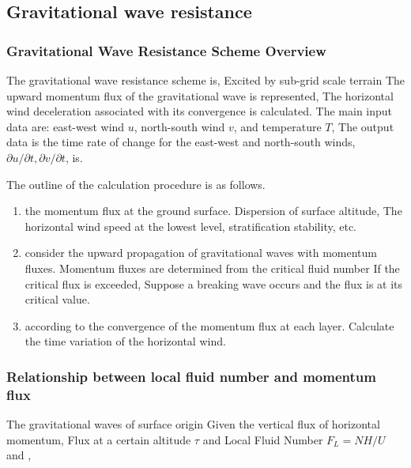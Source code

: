 \hypertarget{gravitational-wave-resistance}{%
\subsection{Gravitational wave
resistance}\label{gravitational-wave-resistance}}

\hypertarget{gravitational-wave-resistance-scheme-overview}{%
\subsubsection{Gravitational Wave Resistance Scheme
Overview}\label{gravitational-wave-resistance-scheme-overview}}

The gravitational wave resistance scheme is, Excited by sub-grid scale
terrain The upward momentum flux of the gravitational wave is
represented, The horizontal wind deceleration associated with its
convergence is calculated. The main input data are: east-west wind
\(u\), north-south wind \(v\), and temperature \(T\), The output data is
the time rate of change for the east-west and north-south winds,
\(\partial u/\partial t, \partial v/\partial t\), is.

The outline of the calculation procedure is as follows.

\begin{enumerate}
\def\labelenumi{\arabic{enumi}.}
\item
  the momentum flux at the ground surface. Dispersion of surface
  altitude, The horizontal wind speed at the lowest level,
  stratification stability, etc.
\item
  consider the upward propagation of gravitational waves with momentum
  fluxes. Momentum fluxes are determined from the critical fluid number
  If the critical flux is exceeded, Suppose a breaking wave occurs and
  the flux is at its critical value.
\item
  according to the convergence of the momentum flux at each layer.
  Calculate the time variation of the horizontal wind.
\end{enumerate}

\hypertarget{relationship-between-local-fluid-number-and-momentum-flux}{%
\subsubsection{Relationship between local fluid number and momentum
flux}\label{relationship-between-local-fluid-number-and-momentum-flux}}

The gravitational waves of surface origin Given the vertical flux of
horizontal momentum, Flux at a certain altitude \(\tau\) and Local Fluid
Number \(F_L = NH/U\) and ,

